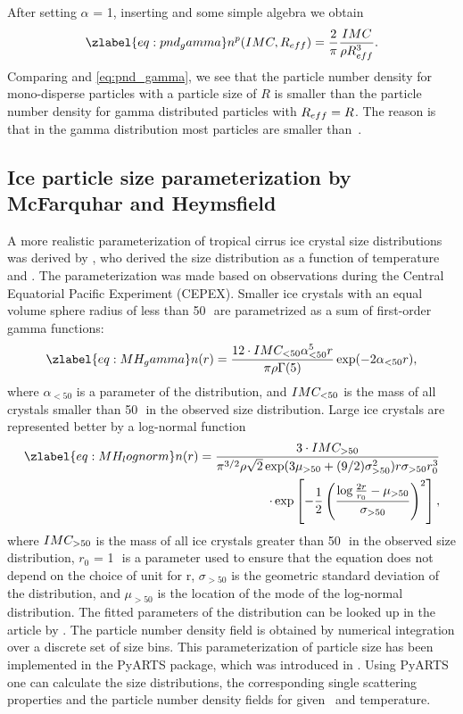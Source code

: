 After setting $\alpha$ = 1, inserting  and
some simple algebra we obtain
\begin{equation}
  \zlabel{eq:pnd_gamma}
  n^p(\imc, \Reff) = \frac{2}{\pi} \frac{\imc}{\rho \Reff^3}.
\end{equation}
Comparing  and \eqref{eq:pnd_gamma}, we see
that the particle number density for mono-disperse particles with a
particle size of $R$ is smaller than the particle number density for
gamma distributed particles with $R_{eff}=R$. The reason is that in the
gamma distribution most particles are smaller than~\Reff.

\subsection[McFarquhar and Heymsfield parametrization]{Ice particle size parameterization by McFarquhar and Heymsfield}

A more realistic parameterization of tropical cirrus ice crystal size
distributions was derived by
\citet{mcfarquar97:_param_tropic_cirrus_ice_cryst}, who derived the
size distribution as a function of temperature and \imc. The
parameterization was made based on observations during the Central
Equatorial Pacific Experiment (CEPEX). Smaller ice crystals with an
equal volume sphere radius of less than 50\,\mum\ are parametrized
as a sum of first-order gamma functions:
\begin{equation}
  \zlabel{eq:MH_gamma}
  n(r) = \frac{12\cdot \imc_{<50}\alpha^5_{<50} r}{\pi \rho
    \Gamma(5)} \exp(-2 \alpha_{<50} r), 
\end{equation}
where $\alpha_{<50}$ is a parameter of the distribution, and
$IMC_{<50}$ is the mass of all crystals smaller than 50\,\mum\ in
the observed size distribution.  Large ice crystals are represented
better by a log-normal function
\begin{eqnarray}
  \zlabel{eq:MH_lognorm}
  n(r) = \frac{3\cdot\imc_{>50}}{\pi^{3/2}\rho \sqrt{2}
    \exp(3\mu_{>50}+(9/2)\sigma^2_{>50}) r \sigma_{>50} r_0^3}
  \nonumber \\
  \cdot \exp\left[-\frac{1}{2}\left(\frac{\log\frac{2r}{r_0} -
          \mu_{>50}}{\sigma_{>50}}\right)^2\right], 
\end{eqnarray}
where $IMC_{>50}$ is the mass of all ice crystals greater than
50\,\mum\ in the observed size distribution, $r_0$ = 1\,\mum\ is a
parameter used to ensure that the equation does not depend on the
choice of unit for r, $\sigma_{>50}$ is the geometric standard
deviation of the distribution, and $\mu_{>50}$ is the location of the
mode of the log-normal distribution.  The fitted parameters of the
distribution can be looked up in the article by
\citet{mcfarquar97:_param_tropic_cirrus_ice_cryst}.  The particle
number density field is obtained by numerical integration over a
discrete set of size bins. This parameterization of particle size has
been implemented in the PyARTS package, which was introduced in
. Using PyARTS one can calculate the size
distributions, the corresponding single scattering properties and the
particle number density fields for given \imc\ and temperature.
